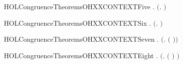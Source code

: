 \newcommand{\HOLCongruenceTheoremsOHXXCONTEXTFour}{\UseVerbatim{HOLCongruenceTheoremsOHXXCONTEXTFour}}
\begin{SaveVerbatim}{HOLCongruenceTheoremsOHXXCONTEXTFive}
\HOLTokenTurnstile{} \HOLSymConst{\HOLTokenForall{}} .   \HOLSymConst{\HOLTokenImp{}}  \ensuremath{(}\HOLTokenLambda{}.   \HOLSymConst{\ensuremath{\mid}} \ensuremath{)}
\end{SaveVerbatim}
\newcommand{\HOLCongruenceTheoremsOHXXCONTEXTFive}{\UseVerbatim{HOLCongruenceTheoremsOHXXCONTEXTFive}}
\begin{SaveVerbatim}{HOLCongruenceTheoremsOHXXCONTEXTSix}
\HOLTokenTurnstile{} \HOLSymConst{\HOLTokenForall{}} .   \HOLSymConst{\HOLTokenImp{}}  \ensuremath{(}\HOLTokenLambda{}.  \HOLSymConst{\ensuremath{\mid}}  \ensuremath{)}
\end{SaveVerbatim}
\newcommand{\HOLCongruenceTheoremsOHXXCONTEXTSix}{\UseVerbatim{HOLCongruenceTheoremsOHXXCONTEXTSix}}
\begin{SaveVerbatim}{HOLCongruenceTheoremsOHXXCONTEXTSeven}
\HOLTokenTurnstile{} \HOLSymConst{\HOLTokenForall{}} .   \HOLSymConst{\HOLTokenImp{}}  \ensuremath{(}\HOLTokenLambda{}.   \ensuremath{(} \ensuremath{)}\ensuremath{)}
\end{SaveVerbatim}
\newcommand{\HOLCongruenceTheoremsOHXXCONTEXTSeven}{\UseVerbatim{HOLCongruenceTheoremsOHXXCONTEXTSeven}}
\begin{SaveVerbatim}{HOLCongruenceTheoremsOHXXCONTEXTEight}
\HOLTokenTurnstile{} \HOLSymConst{\HOLTokenForall{}} .   \HOLSymConst{\HOLTokenImp{}}  \ensuremath{(}\HOLTokenLambda{}.  \ensuremath{(} \ensuremath{)} \ensuremath{)}
\end{SaveVerbatim}
\newcommand{\HOLCongruenceTheoremsOHXXCONTEXTEight}{\UseVerbatim{HOLCongruenceTheoremsOHXXCONTEXTEight}}

